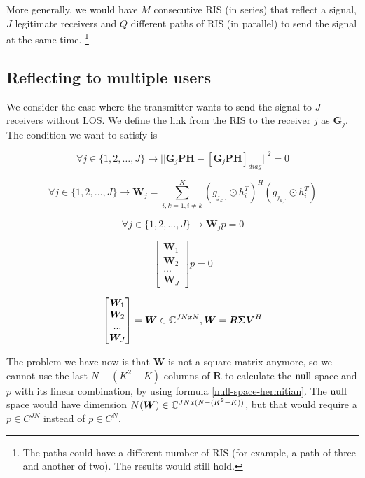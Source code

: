 More generally, we would have $M$ consecutive RIS (in series) that reflect a signal, $J$ legitimate receivers and $Q$ different paths of RIS (in parallel) to send the signal at the same time. \footnote{The paths could have a different number of RIS (for example, a path of three and another of two). The results would still hold.}

\subsection{Reflecting to multiple users}

We consider the case where the transmitter wants to send the signal to $J$ receivers without LOS. We define the link from the RIS to the receiver $j$ as $\bm{G}_j$. The condition we want to satisfy is

\begin{equation}
  \forall j \in \{1, 2, \ldots , J\} \rightarrow || \bm{G}_j\bm{PH} - [\bm{G}_j\bm{PH}]_{diag} || ^2 = 0
\end{equation}

\begin{equation}
  \forall j \in \{1, 2, \ldots , J\} \rightarrow \bm{W}_j = \sum_{i,k = 1, i \ne k}^{K} (g_{j_{k,:}} \odot h_i^T)^H (g_{j_{k,:}} \odot h_i^T)
\end{equation}

\begin{equation}
  \forall j \in \{1, 2, \ldots , J\} \rightarrow \bm{W}_j p = 0
\end{equation}

\begin{equation}
  \begin{bmatrix}
    \bm{W}_1  \\
    \bm{W}_ 2 \\
    ...       \\
    \bm{W}_J
  \end{bmatrix}
  p = 0
\end{equation}

\begin{equation}
  \begin{bmatrix}
    \bm{W}_1  \\
    \bm{W}_ 2 \\
    ...       \\
    \bm{W}_J
  \end{bmatrix}
  = \bm{W} \in \mathbb{C} ^ {JNxN}, \bm{W} = \bm{R \Sigma V}^H
\end{equation}

The problem we have now is that $\bm{W}$ is not a square matrix anymore, so we cannot use the last $N - (K^2 - K)$ columns of $\bm{R}$ to calculate the $\operatorname{null}$ space and $p$ with its linear combination, by using formula \eqref{null-space-hermitian}. The $\operatorname{null}$ space would have dimension $N(\bm{W}) \in \mathbb{C}^{JN x (N - (K^2 - K))}$, but that would require a $p \in C^{JN}$ instead of $p \in C^{N}$.

